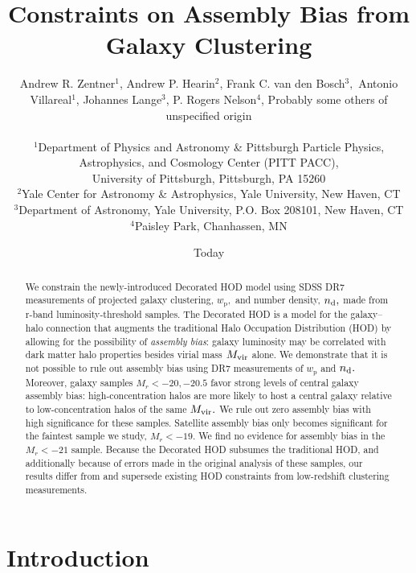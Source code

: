 \documentclass[usenatbib,usegraphicx,letterpaper]{mn2e}
\title[Clustering Constraints on Assembly Bias]
{
Constraints on Assembly Bias from Galaxy Clustering
}
\author[Zentner et al.]
{Andrew R. Zentner$^{1}$, Andrew P. Hearin$^{2}$, Frank C. van den Bosch$^{3},$ \newauthor
Antonio Villareal$^{1}$, Johannes Lange$^{3}$, P. Rogers Nelson$^{4}$, Probably some others of unspecified origin\\ \\
$^1$Department of Physics and Astronomy \& Pittsburgh Particle Physics, Astrophysics, and Cosmology Center (PITT PACC),\\ University of Pittsburgh, Pittsburgh, PA 15260\\
$^2$Yale Center for Astronomy \& Astrophysics, Yale University, New Haven, CT\\
$^3$Department of Astronomy, Yale University, P.O. Box 208101, New Haven, CT\\
$^4$Paisley Park, Chanhassen, MN\\
}
\date{Today}
\newcommand{\mvir}{M_{\rm vir}}
\newcommand{\wprp}{w_{\mathrm{p}}}
\newcommand{\magr}{M_r}
\begin{document}
\maketitle
\begin{abstract}
We constrain the newly-introduced Decorated HOD model using SDSS DR7 measurements of projected galaxy clustering, $\wprp,$ and number density, $n_{\rm d},$ made from r-band luminosity-threshold samples. The Decorated HOD is a model for the galaxy--halo connection that augments the traditional Halo Occupation Distribution (HOD) by allowing for the possibility of {\em assembly bias}: galaxy luminosity may be correlated with dark matter halo properties besides virial mass $\mvir$ alone. We demonstrate that it is not possible to rule out assembly bias using DR7 measurements of $\wprp$ and $n_{\rm d}.$ Moreover, galaxy samples $\magr<-20, -20.5$ favor strong levels of central galaxy assembly bias: high-concentration halos are more likely to host a central galaxy relative to low-concentration halos of the same $\mvir.$ We rule out zero assembly bias with high significance for these samples. Satellite assembly bias only becomes significant for the faintest sample we study, $\magr<-19.$ We find no evidence for assembly bias in the $\magr<-21$ sample. Because the Decorated HOD subsumes the traditional HOD, and additionally because of errors made in the original analysis of these samples, our results differ from and supersede existing HOD constraints from low-redshift clustering measurements. 
\end{abstract} 

\section{Introduction}
\label{section:introduction}
\end{document}
